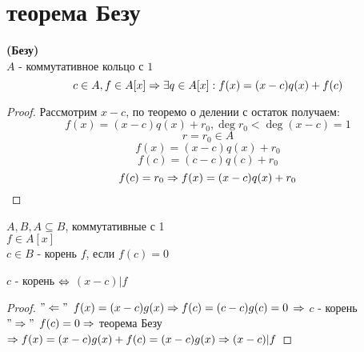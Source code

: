 \section{теорема Безу}
\begin{theorem}{}
\textbf{(Безу)}\\
	$A$ - коммутативное кольцо с $1$
	$$ c \in A, f \in A[x] \Rightarrow \exists q \in A[x]: f(x) = (x - c)q(x) + f(c) $$
\end{theorem}

\begin{proof}
	Рассмотрим $x - c$, по теоремо о делении с остаток получаем:
	$$ f(x) = (x - c)q(x) + r_0, \deg r_0 < \deg (x - c) = 1 $$
	$$ r = r_0 \in A $$
	$$ f(x) = (x - c)q(x) + r_0 $$
	$$ f(c) = (c - c)q(c) + r_0 $$
	$$ f(c) = r_0 \Rightarrow f(x) = (x - c)q(x) + r_0 $$
\end{proof}

\begin{Def}
	$A, B, A \subseteq B$, коммутативные с 1\\
	$f \in A[x]$\\
	$c \in B$ - корень $f$, если $f(c) = 0$\\
\end{Def}

\begin{conseq}
	$c$ - корень $\Leftrightarrow$ $(x - c) | f$\\
\end{conseq}

\begin{proof}
	$"\Leftarrow"$	$f(x) = (x - c)g(x) \Rightarrow f(c) = (c-c)g(c) = 0$ $\Rightarrow$ $c$ - корень\\
	$"\Rightarrow"$	$f(c) = 0 \Rightarrow$ теорема Безу $\Rightarrow f(x) = (x-c)g(x) + f(c) = (x-c)g(x) \Rightarrow (x-c) | f$
\end{proof}
